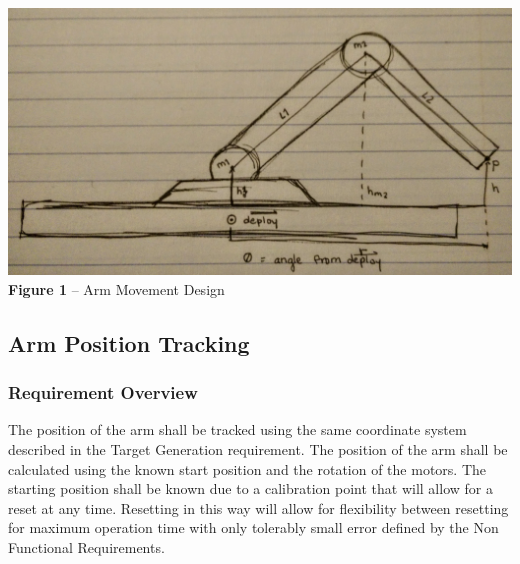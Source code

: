 \documentclass[letterpaper,10pt]{article}
\begin{document}
\begin{center}
\includegraphics[width=\textwidth]{armDiagram}
\textbf{Figure 1} -- Arm Movement Design
\end{center}

\subsection{Arm Position Tracking}
\subsubsection{Requirement Overview}
The position of the arm shall be tracked using the same coordinate system described in the Target Generation requirement.
The position of the arm shall be calculated using the known start position and the rotation of the motors.
The starting position shall be known due to a calibration point that will allow for a reset at any time.
Resetting in this way will allow for flexibility between resetting for maximum operation time with only tolerably small error defined by the Non Functional Requirements.
\end{document}
